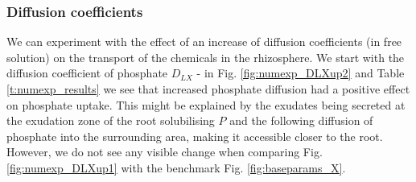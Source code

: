 \documentclass[11pt]{article}
\numberwithin{equation}{section}
\begin{document}
\subsubsection{Diffusion coefficients}
We can experiment with the effect of an increase of diffusion coefficients (in free solution) on the transport of the chemicals in the rhizosphere. We start with the diffusion coefficient of phosphate $D_{LX}$ - in Fig. \ref{fig:numexp_DLXup2} and Table \ref{t:numexp_results} we see that increased phosphate diffusion had a positive effect on phosphate uptake. This might be explained by the exudates being secreted at the exudation zone of the root solubilising $P$ and the following diffusion of phosphate into the surrounding area, making it accessible closer to the root. However, we do not see any visible change when comparing Fig. \ref{fig:numexp_DLXup1} with the benchmark Fig. \ref{fig:baseparams_X}.
\end{document}
